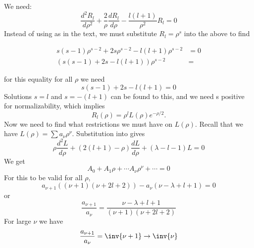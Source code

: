 We need:
\begin{equation}\label{eqn:PHY356FLecture10:140b}
\frac{d^2 R_l}{d\rho^2} + \frac{2}{\rho} \frac{d R_l}{d\rho} - \frac{l(l+1)}{\rho^2} R_l = 0
\end{equation}
%
Instead of using  as in the text, we must substitute \(R_l = \rho^s\) into the above to find

\begin{align}\label{eqn:PHY356FLecture10:150}
s(s-1) \rho^{s-2} + 2 s \rho^{s-2} - l(l+1) \rho^{s-2} &= 0 \\
\left( s(s-1) + 2 s - l(l+1) \right) \rho^{s-2} &=
\end{align}

for this equality for all \(\rho\) we need
%
\begin{equation}\label{eqn:PHY356FLecture10:160}
s(s-1) + 2 s - l(l+1) = 0
\end{equation}
%
Solutions \(s = l\) and \(s = -(l+1)\) can be found to this, and we need s positive for normalizability, which implies
%
\begin{equation}\label{eqn:PHY356FLecture10:170}
R_l(\rho) = \rho^l L(\rho) e^{-\rho/2}.
\end{equation}
%
Now we need to find what restrictions we must have on \(L(\rho)\).  Recall that we have \(L(\rho) = \sum a_\nu \rho^\nu\).  Substitution into  gives
%
\begin{equation}\label{eqn:PHY356FLecture10:180}
\rho \frac{d^2 L}{d\rho} + \left( 2(l+1) - \rho \right) \frac{d L}{d \rho} + (\lambda - l - 1) L = 0
\end{equation}
%
We get
\begin{equation}\label{eqn:PHY356FLecture10:190}
A_0 + A_1 \rho + \cdots A_\nu \rho^\nu + \cdots = 0
\end{equation}
%
For this to be valid for all \(\rho\),
%
\begin{equation}\label{eqn:PHY356FLecture10:200}
a_{\nu+1} \left(
(\nu+1)(\nu+ 2l + 2)
\right)
-
a_{\nu} \left(
\nu - \lambda + l + 1
\right)
=0
\end{equation}
%
or
\begin{equation}\label{eqn:PHY356FLecture10:210}
\frac{a_{\nu+1}}{ a_{\nu} }
=
\frac{ \nu - \lambda + l + 1 }{ (\nu+1)(\nu+ 2l + 2) }
\end{equation}
%
For large \(\nu\) we have
\begin{equation}\label{eqn:PHY356FLecture10:220}
\frac{a_{\nu+1}}{ a_{\nu} }
=
\inv{\nu+1}
\rightarrow \inv{\nu}
\end{equation}
